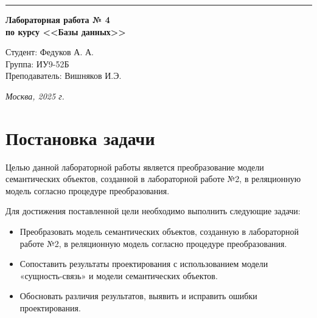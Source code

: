 \documentclass[a4paper, 14pt]{extarticle}
\begin{document}
\begin{titlepage}
\vspace*{-16pt}
\hspace{30pt}\rule{0.866\textwidth}{0.4pt}
  
\vspace{11em}

\begin{center}
\Large {\bf Лабораторная работа № 4} \\ 
\large {\bf по курсу <<Базы данных>>} \\

\end{center}\normalsize

\vspace{8em}


\begin{flushright}
 \begin{minipage}{0.5\linewidth}
      {Студент: Федуков А. А. \hspace*{15pt}\\ 
      Группа: ИУ9-52Б \\ 
      Преподаватель: Вишняков И.Э. \hspace*{15pt}}
  \end{minipage}
\end{flushright}
\bigskip
\vfill
\begin{center}
\textsl{Москва, 2025 г.}
\end{center}
\end{titlepage}

\renewcommand{\ttdefault}{pcr}

\setlength{\tabcolsep}{3pt}
\newpage
\setcounter{page}{2}

{
  \hypersetup{linkcolor=black}
  \tableofcontents
}


\section*{Постановка задачи}\label{Sect::goal}
Целью данной лабораторной работы является преобразование модели семантических объектов, созданной в лабораторной работе №2, в реляционную модель согласно процедуре преобразования.

Для достижения поставленной цели необходимо выполнить следующие задачи:
\begin{itemize}
  \item Преобразовать модель семантических объектов, созданную в лабораторной работе №2, в реляционную модель согласно процедуре преобразования.
  \item Сопоставить результаты проектирования с использованием модели «сущность-связь»  и модели семантических объектов.
  \item Обосновать различия результатов, выявить и исправить ошибки проектирования.
\end{itemize}
\end{document}

